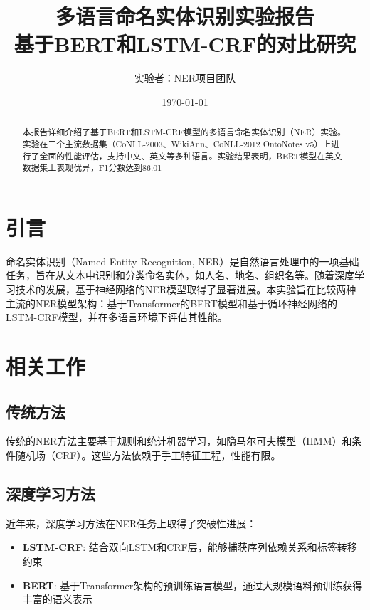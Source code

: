\documentclass{article}
\begin{document}
\title{\textbf{多语言命名实体识别实验报告}\\[0.5cm]
\large{基于BERT和LSTM-CRF的对比研究}}
\author{实验者：NER项目团队}
\date{\today}

\maketitle

\begin{abstract}
本报告详细介绍了基于BERT和LSTM-CRF模型的多语言命名实体识别（NER）实验。实验在三个主流数据集（CoNLL-2003、WikiAnn、CoNLL-2012 OntoNotes v5）上进行了全面的性能评估，支持中文、英文等多种语言。实验结果表明，BERT模型在英文数据集上表现优异，F1分数达到86.01%
\end{abstract}

\tableofcontents
\newpage

\section{引言}

命名实体识别（Named Entity Recognition, NER）是自然语言处理中的一项基础任务，旨在从文本中识别和分类命名实体，如人名、地名、组织名等。随着深度学习技术的发展，基于神经网络的NER模型取得了显著进展。本实验旨在比较两种主流的NER模型架构：基于Transformer的BERT模型和基于循环神经网络的LSTM-CRF模型，并在多语言环境下评估其性能。

\section{相关工作}

\subsection{传统方法}
传统的NER方法主要基于规则和统计机器学习，如隐马尔可夫模型（HMM）和条件随机场（CRF）。这些方法依赖于手工特征工程，性能有限。

\subsection{深度学习方法}
近年来，深度学习方法在NER任务上取得了突破性进展：

\begin{itemize}
    \item \textbf{LSTM-CRF}: 结合双向LSTM和CRF层，能够捕获序列依赖关系和标签转移约束
    \item \textbf{BERT}: 基于Transformer架构的预训练语言模型，通过大规模语料预训练获得丰富的语义表示
\end{itemize}
\end{document}
